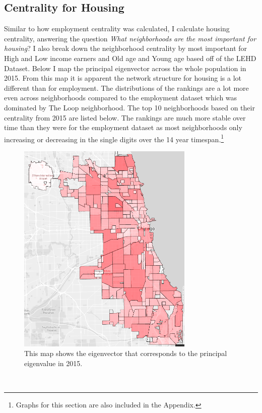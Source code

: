 \documentclass{article}
\theoremstyle{definition}
\theoremstyle{remark}
\begin{document}
\subsection{Centrality for Housing}
Similar to how employment centrality was calculated, I calculate housing centrality, answering the question \textit{What neighborhoods are the most important for housing}?  I also break down the neighborhood centrality by most important for High and Low income earners and Old age and Young age based off of the LEHD Dataset.  Below I map the principal eigenvector across the whole population in 2015.  From this map it is apparent the network structure for housing is a lot different than for employment. The distributions of the rankings are a lot more even across neighborhoods compared to the employment dataset which was dominated by The Loop neighborhood.  The top 10 neighborhoods based on their centrality from 2015 are listed below.  The rankings are much more stable over time than they were for the employment dataset as most neighborhoods only increasing or decreasing in the single digits over the 14 year timespan.\footnote{Graphs for this section are also included in the Appendix.}\\

{\centering
\begin{figure}[H]
    \centering
    \includegraphics[width=0.75\textwidth]{Houses-S000-2015}
    \caption{This map shows the eigenvector that corresponds to the principal eigenvalue in 2015.}
    \label{fig:Houses-S000-2015}
\end{figure} } \\
\end{document}
